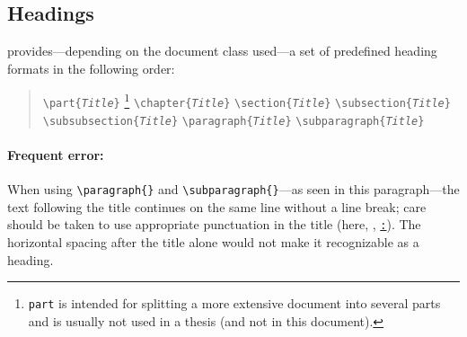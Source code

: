 \subsection{Headings}
\label{sec:headings}

\latex provides---depending on the document class used---a set of predefined
heading formats in the following order:
%
\begin{quote}
    \verb!\part{!\texttt{\em Title}\verb!}!%
    \footnote{\texttt{part} is intended for splitting a more extensive document
    into several parts and is usually not used in a thesis (and not in this
    document).}
    \newline%
    \verb!\chapter{!\texttt{\em Title}\verb!}! \newline%
    \verb!\section{!\texttt{\em Title}\verb!}! \newline%
    \verb!\subsection{!\texttt{\em Title}\verb!}! \newline%
    \verb!\subsubsection{!\texttt{\em Title}\verb!}! \newline%
    \verb!\paragraph{!\texttt{\em Title}\verb!}! \newline%
    \verb!\subparagraph{!\texttt{\em Title}\verb!}!
\end{quote}
%
\paragraph{Frequent error:} When using \verb!\paragraph{}! and
\verb!\subparagraph{}!---as seen in this paragraph---the text following the
title continues on the same line without a line break; care should be taken to
use appropriate punctuation in the title (here, \eg, \underline{\texttt{:}}).
The horizontal spacing after the title alone would not make it recognizable as a
heading.

